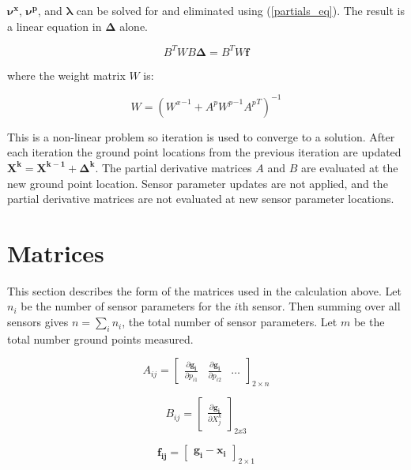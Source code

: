 \documentclass[]{article}
\newcommand{\imgmeas}{\pmb{x_{i}}}
\begin{document}
$\pmb{\nu^x}$, $\pmb{\nu^p}$, and $\pmb{\lambda}$ can be solved for and eliminated using (\ref{partials_eq}).  The result is a linear equation in $\pmb{\Delta}$ alone.

\begin{equation*}
B^T W B\pmb{\Delta} = B^T W \pmb{f}
\end{equation*}

where the weight matrix $W$ is:

\begin{equation*}
W = ({W^x}^{-1} + A^p {W^p}^{-1} {A^p}^T)^{-1}
\end{equation*}

This is a non-linear problem so iteration is used to converge to a solution.  After each iteration the ground point locations from the previous iteration are updated $\pmb{X^k} = \pmb{X^{k - 1}} + \pmb{\Delta^k}$.  The partial derivative matrices $A$ and $B$ are evaluated at the new ground point location.  Sensor parameter updates are not applied, and the partial derivative matrices are not evaluated at new sensor parameter locations.

\section*{Matrices} 
\label{sec:matrices}

This section describes the form of the matrices used in the calculation above.  Let $n_i$ be the number of sensor parameters for the $i$th sensor.  Then summing over all sensors gives $n = \sum_{i}n_i$, the total number of sensor parameters.  Let $m$ be the total number ground points measured.

\begin{equation*}
A_{ij} = 
\begin{bmatrix}
\frac{\partial{\pmb{g_i}}}{\partial{p_{i1}}} & \frac{\partial{\pmb{g_i}}}{\partial{p_{i2}}} & \ldots
\end{bmatrix}_{2\times n}
\end{equation*}

\begin{equation*}
B_{ij} =
\begin{bmatrix}
\frac{\partial{\pmb{g_i}}}{\partial{X_j^k}}
\end{bmatrix}_{2x3}
\end{equation*}

\begin{equation*}
\pmb{f_{ij}} =
\begin{bmatrix}
\pmb{g_i} - \imgmeas
\end{bmatrix}_{2\times1}
\end{equation*}
\end{document}
